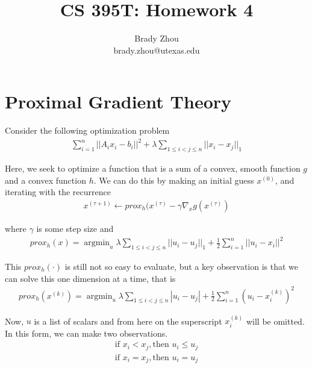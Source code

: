 \documentclass[a4paper]{article}
\title{CS 395T: Homework 4}
\author{Brady Zhou \\ brady.zhou@utexas.edu}
\DeclareMathOperator*{\argmin}{argmin}
\begin{document}
\maketitle

\section{Proximal Gradient Theory}

Consider the following optimization problem
\begin{align}
\sum_{i=1}^n ||A_i x_i - b_i||^2 + \lambda \sum_{1 \leq i < j \leq n} ||x_i - x_j||_1
\end{align}

Here, we seek to optimize a function that is a sum of a convex, smooth function $g$ and a convex function $h$. We can do this by making an initial guess $x^{(0)}$, and iterating with the recurrence
\begin{align}
x^{(\tau + 1)} \leftarrow prox_h(x^{(\tau)} - \gamma \nabla_x g(x^{(\tau)})
\end{align}

where $\gamma$ is some step size and
\begin{align}
prox_h(x) = \argmin_u \lambda \sum_{1 \leq i <  j \leq n} ||u_i - u_j||_1 + \frac{1}{2} \sum_{i=1}^n ||u_i - x_i||^2
\end{align}

This $prox_h(\cdot)$ is still not so easy to evaluate, but a key observation is that we can solve this one dimension at a time, that is
\begin{align}
prox_h(x^{(k)}) = \argmin_u \lambda \sum_{1 \leq i <  j \leq n} |u_i - u_j| + \frac{1}{2} \sum_{i=1}^n (u_i - x_i^{(k)})^2
\end{align}

Now, $u$ is a list of scalars and from here on the superscript $x_i^{(k)}$ will be omitted. \\

In this form, we can make two observations.
\begin{align}
\text{if } x_i < x_j, \text{then } u_i \leq u_j \\
\text{if } x_i = x_j, \text{then } u_i = u_j 
\end{align}
\end{document}
